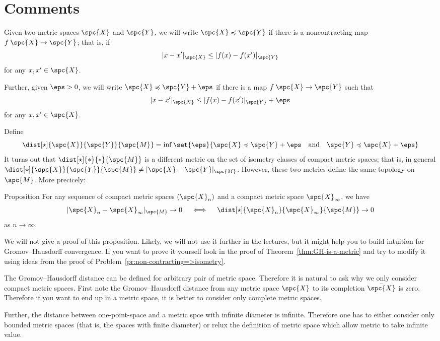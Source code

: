 \section{Comments} 

Given two metric spaces $\spc{X}$ and $\spc{Y}$, we will write $\spc{X}\preccurlyeq \spc{Y}$ if there is a noncontracting map $f\:\spc{X}\to \spc{Y}$;
that is, if 
$$ |x-x'|_{\spc{X}}\le|f(x)-f(x')|_{\spc{Y}}$$
for any $x,x'\in \spc{X}$.

Further, given $\eps>0$, we will write $\spc{X}\preccurlyeq \spc{Y}+\eps$
if there is a map $f\:\spc{X}\to \spc{Y}$ such that 
$$|x-x'|_{\spc{X}}\le|f(x)-f(x')|_{\spc{Y}}+\eps$$
for any $x,x'\in \spc{X}$.

Define 
$$\dist[\star]{\spc{X}}{\spc{Y}}{\spc{M}}=\inf\set{\eps}{\spc{X}\preccurlyeq \spc{Y}+\eps
\quad\text{and}\quad
\spc{Y}\preccurlyeq \spc{X}+\eps}$$
It turns out that $\dist[\star]{*}{*}{\spc{M}}$ is a different metric on the set of isometry classes of compact metric spaces; that is, in general $\dist[\star]{\spc{X}}{\spc{Y}}{\spc{M}}\not=|\spc{X}-\spc{Y}|_{\spc{M}}$. 
However, these two metrics define the same topology on $\spc{M}$.
More precicely:

\begin{thm}{Proposition}\label{GH-po}
For any sequence of compact metric spaces $(\spc{X}_n)$ and a compact metric space $\spc{X}_\infty$,
we have
$$|\spc{X}_n-\spc{X}_\infty|_{\spc{M}}\to 0
\quad\iff\quad
\dist[\star]{\spc{X}_n}{\spc{X}_\infty}{\spc{M}}\to 0$$ 
as $n\to\infty$.
\end{thm}

We will not give a proof of this proposition. 
Likely, we will not use it further in the lectures, 
but it might help you to build intuition for Gromov--Hausdorff convergence.
If you want to prove it yourself look in the proof of Theorem~\ref{thm:GH-is-a-metric} 
and try to modify it using ideas from the proof of Problem~\ref{pr:non-contracting=>isometry}.

The Gromov--Hausdorff distance can be defined for arbitrary pair of metric space.
Therefore it is natural to ask why we only consider compact metric spaces.
First note the Gromov--Hausdorff distance from any metric space $\spc{X}$ 
to its completion $\bar {\spc{X}}$ is zero.
Therefore if you want to end up in a metric space, it is better to consider only complete metric spaces.

Further, the distance between one-point-space and a metric spce with infinite diameter is infinite.
Therefore one has to either consider only bounded metric spaces (that is, the spaces with finite diameter)
or relux the definition of metric space which allow metric to take infinite value.

